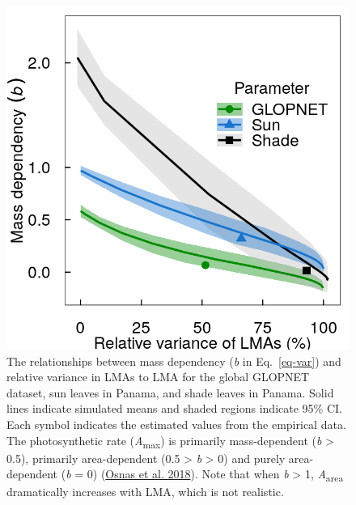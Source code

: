 \documentclass[
  12pt,
  a4paper,
,tablecaptionabove
]{scrartcl}
\begin{document}
\newpage

\begin{figure}

{\centering \includegraphics{../figs/mass_prop_mv.png}

}

\caption{\label{fig-massplt}The relationships between mass dependency
(\emph{b} in Eq.~\ref{eq-var}) and relative variance in LMAs to LMA for
the global GLOPNET dataset, sun leaves in Panama, and shade leaves in
Panama. Solid lines indicate simulated means and shaded regions indicate
95\% CI. Each symbol indicates the estimated values from the empirical
data. The photosynthetic rate (\emph{A}\textsubscript{max}) is primarily
mass-dependent (\emph{b} \textgreater{} 0.5), primarily area-dependent
(0.5 \textgreater{} \emph{b} \textgreater{} 0) and purely area-dependent
(\emph{b} = 0) (\protect\hyperlink{ref-Osnas2018}{Osnas et al. 2018}).
Note that when \emph{b} \textgreater{} 1, \emph{A}\textsubscript{area}
dramatically increases with LMA, which is not realistic.}

\end{figure}

\newpage
\end{document}
